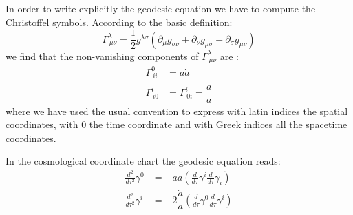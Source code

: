 \documentclass[Main]{subfiles}
\begin{document}
		In order to write explicitly the geodesic equation we have to compute the Christoffel symbols. According to the basic definition:
		\begin{displaymath}
			\Gamma^\lambda_{\, \mu \nu} = \frac{1}{2} g^{\lambda \sigma } \left( \partial_\mu g_{\sigma \nu} + \partial_\nu g_{\mu \sigma} - \partial_{\sigma}g_{\mu \nu} \right)
		\end{displaymath}
		we find that the non-vanishing components of $\Gamma^\lambda_{\, \mu \nu}$ are : %
			\begin{align}
				\Gamma^0_{\, i i} &= a \dot{a} \\
				\Gamma^i_{\, i 0} &= \Gamma^i_{\, 0 i} = \dfrac{\dot{a}}{a}
			\end{align}
			where we have used the usual convention to express with latin indices the spatial coordinates, with $0$ the time coordinate and with Greek indices all the spacetime coordinates.
			
			In the cosmological coordinate chart the geodesic equation reads:
			\begin{eqnarray}
				\frac{d^2}{d \tau^2} \gamma^0 &= - a \dot{a} \left( \frac{d}{d \tau} \gamma^i \frac{d}{d \tau}\gamma_i \right) \label{FRWGeo1}\\
				\frac{d^2}{d \tau^2} \gamma^i &= - 2 \dfrac{\dot{a}}{a} \left( \frac{d}{d \tau} \gamma^0 \frac{d}{d \tau}\gamma^i \right) 		\label{FRWGeo2}	
			\end{eqnarray}
			
\end{document}
